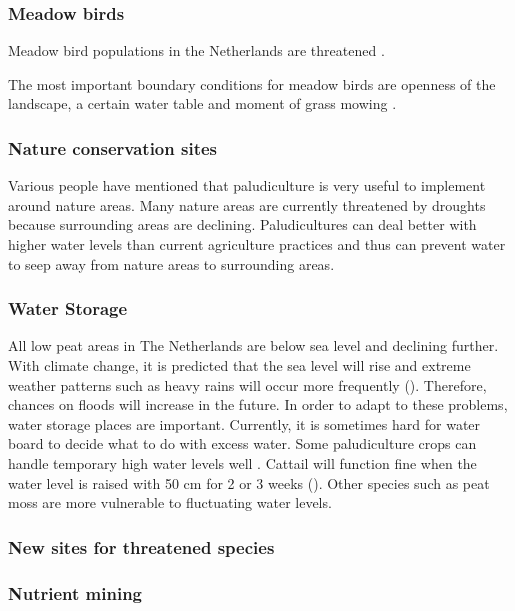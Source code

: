 \documentclass[12pt,a4paper,titlepage]{article}
\begin{document}
\subsubsection{Meadow birds}

Meadow bird populations in the Netherlands are threatened \citep{}. 

The most important boundary conditions for meadow birds are openness of the landscape, a certain water table and moment of grass mowing \citep{teunissen2012op}. 


\subsubsection{Nature conservation sites}

Various people have mentioned that paludiculture is very useful to implement around nature areas. Many nature areas are currently threatened by droughts because surrounding areas are declining. Paludicultures can deal better with higher water levels than current agriculture practices and thus can prevent water to seep away from nature areas to surrounding areas.

\subsubsection{Water Storage}

All low peat areas in The Netherlands are below sea level and declining further. With climate change, it is predicted that the sea level will rise and extreme weather patterns such as heavy rains will occur more frequently (). Therefore, chances on floods will increase in the future. In order to adapt to these problems, water storage places are important. Currently, it is sometimes hard for water board to decide what to do with excess water. Some paludiculture crops can handle temporary high water levels well \citep{wichtmann2016paludiculture}. Cattail will function fine when the water level is raised with 50 cm for 2 or 3 weeks (). Other species such as peat moss are more vulnerable to fluctuating water levels. 



\subsubsection{New sites for threatened species}

\subsubsection{Nutrient mining}
\end{document}
